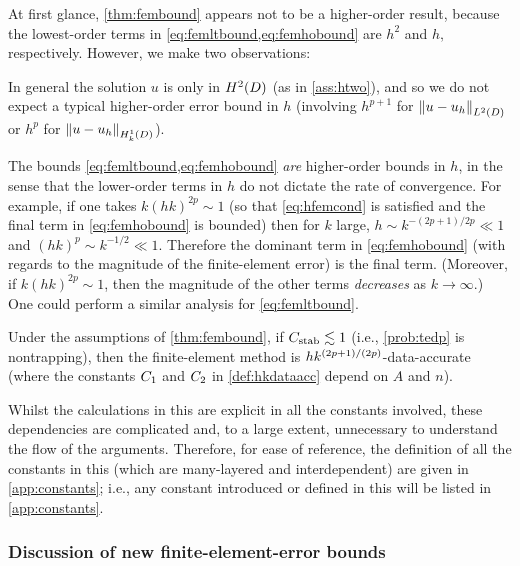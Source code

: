 \label{rem:higherorder}
At first glance, \cref{thm:fembound} appears not to be a higher-order result, because the lowest-order terms in \cref{eq:femltbound,eq:femhobound} are $h^2$ and $h,$  respectively. However, we make two observations:
\ben
\item In general the solution $u$ is only in $\HtD$ (as in \cref{ass:htwo}), and so we do not expect a typical higher-order error bound in $h$ (involving $h^{p+1}$ for $\NLtD{u-\uh}$ or $h^p$ for $\NHokD{u-\uh}$).
  \item The bounds \cref{eq:femltbound,eq:femhobound} \emph{are} higher-order bounds in $h$, in the sense that the lower-order terms in $h$ do not dictate the rate of convergence. For example, if one takes $k(hk)^{2p} \sim 1$ (so that \cref{eq:hfemcond} is satisfied and the final term in \cref{eq:femhobound} is bounded) then for $k$ large, $h \sim k^{-(2p+1)/2p} \ll 1$ and $(hk)^p \sim k^{-1/2} \ll 1$. Therefore the dominant term in \cref{eq:femhobound} (with regards to the magnitude of the finite-element error) is the final term. (Moreover, if $k(hk)^{2p} \sim 1$, then the magnitude of the other terms \emph{decreases} as $k \rightarrow \infty$.) One could perform a similar analysis for \cref{eq:femltbound}.
\een
\ere

\label{cor:dataacc}
Under the assumptions of \cref{thm:fembound}, if $C_{\mathrm{stab}} \lesssim 1$ (i.e., \cref{prob:tedp} is nontrapping), then the finite-element method is $hk^{(2p+1)/(2p)}$-data-accurate (where the constants $C_{1}$ and $C_{2}$ in \cref{def:hkdataacc} depend on $A$ and $n$).
\eco

Whilst the calculations in this  are explicit in all the constants involved, these dependencies are complicated and, to a large extent, unnecessary to understand the flow of the arguments. Therefore, for ease of reference, the definition of all the constants in this  (which are many-layered and interdependent) are given in \cref{app:constants}; i.e., any constant introduced or defined in this  will be listed in \cref{app:constants}.



\subsubsection{Discussion of new finite-element-error bounds}

